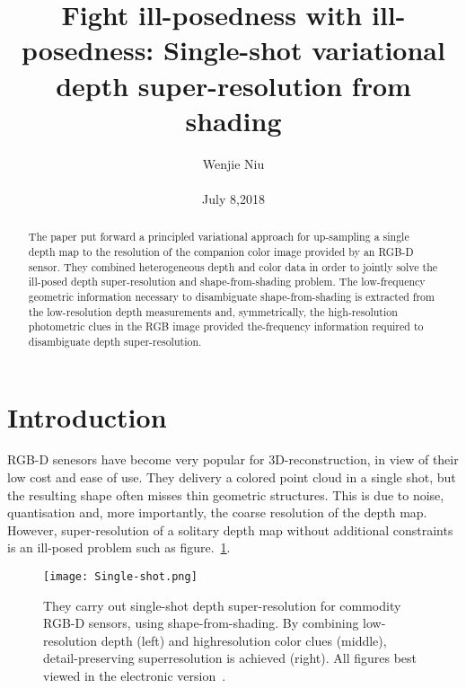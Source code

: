 \documentclass[10pt,twocolumn,letterpaper]{article}
\begin{document}
\title{Fight ill-posedness with ill-posedness: Single-shot variational depth super-resolution from shading}

\author{Wenjie Niu\\\\ July 8,2018}

\maketitle


\begin{abstract}
The paper put forward a principled variational approach for up-sampling a single depth map to the resolution of the companion color image provided by an RGB-D sensor. They combined heterogeneous depth and color data in order to jointly solve the ill-posed depth super-resolution and shape-from-shading problem. The low-frequency geometric information necessary to disambiguate shape-from-shading is extracted from the low-resolution depth measurements and, symmetrically, the high-resolution photometric clues in the RGB image provided the-frequency information required to disambiguate depth super-resolution.    
\end{abstract}

\section{Introduction}
RGB-D senesors have become very popular for 3D-reconstruction, in view of their low cost and ease of use. They delivery a colored point cloud in a single shot, but the resulting shape often misses thin geometric structures. This is due to noise, quantisation and, more importantly, the coarse resolution of the depth map. However, super-resolution of a solitary depth map without additional constraints is an ill-posed problem such as figure.~\ref{fig:Single}.\par

\begin{figure}[!htp]
\begin{center}
   \texttt{[image: Single-shot.png]}
\end{center}
   \caption{They carry out single-shot depth super-resolution for commodity RGB-D sensors, using shape-from-shading. By combining low-resolution depth (left) and highresolution color clues (middle), detail-preserving superresolution is achieved (right). All figures best viewed in the electronic version~\cite{Haefner_2018_CVPR}.}
\label{fig:Single}
\end{figure}
\end{document}
